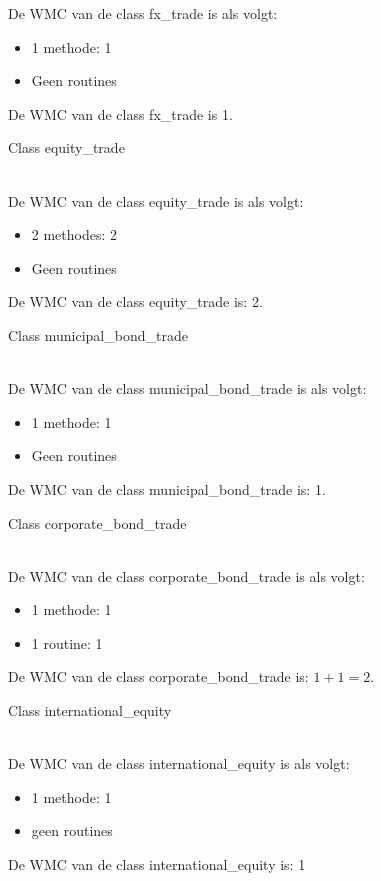 \documentclass[a4paper,titlepage]{artikel1}
\begin{document}
    De WMC van de class fx\_trade is als volgt:
    \begin{itemize}
      \item 1 methode: 1
      \item Geen routines
    \end{itemize}
    De WMC van de class fx\_trade is 1.\\
    \begin{bf}Class equity\_trade\end{bf}\\
    De WMC van de class equity\_trade is als volgt:
    \begin{itemize}
      \item 2 methodes: 2
      \item Geen routines
    \end{itemize}
    De WMC van de class equity\_trade is: 2.\\
    \begin{bf}Class municipal\_bond\_trade\end{bf} \\
    De WMC van de class municipal\_bond\_trade is als volgt:
    \begin{itemize}
      \item 1 methode: 1
      \item Geen routines
    \end{itemize}
    De WMC van de class municipal\_bond\_trade is: 1.\\
    \begin{bf}Class corporate\_bond\_trade\end{bf}\\
    De WMC van de class corporate\_bond\_trade is als volgt:
    \begin{itemize}
      \item 1 methode: 1
      \item 1 routine: 1
    \end{itemize}
    De WMC van de class corporate\_bond\_trade is: $1 + 1 = 2$.\\
    \begin{bf}Class international\_equity\end{bf}\\
    De WMC van de class international\_equity is als volgt:
    \begin{itemize}
      \item 1 methode: 1
      \item geen routines
    \end{itemize}
    De WMC van de class international\_equity is: 1\\
\end{document}
